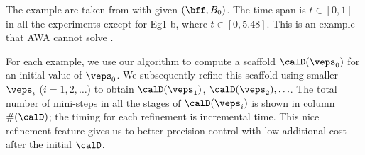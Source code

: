 	
	The example are taken from  with
	given $(\bff, B_0)$.
	The time span is $t\in [0,1]$ in all the experiments
	except for Eg1-b, where $t\in [0,5.48]$.  This is
	an example that AWA cannot solve \cite[p.~13]{bunger:taylorODE:20}.
	
	
	For each example, we use our algorithm to compute a scaffold
	$\calD(\veps_0)$ for an initial value of $\veps_0$.
	We subsequently
	refine this scaffold using smaller $\veps_i$ ($i=1,2,\ldots$)
	to obtain $\calD(\veps_1)$, $\calD(\veps_2), \ldots$.
	The total number of mini-steps in all the stages of
	$\calD(\veps_i)$ is shown in column
	$\#(\calD)$; the timing for
	each refinement is incremental time.
	This nice refinement feature gives
	us to better precision control with
	low additional cost after the initial $\calD$.  
	
	
	
